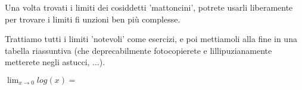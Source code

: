 Una volta trovati i limiti dei cosiddetti 'mattoncini', potrete usarli liberamente per trovare i limiti fi unzioni ben più complesse.

Trattiamo tutti i limiti 'notevoli' come esercizi, e poi mettiamoli alla fine in una tabella riassuntiva (che deprecabilmente
fotocopierete e lillipuzianamente metterete negli astucci, ...).

\begin{esercizio}
$\lim_{x \rightarrow 0} log(x)=$
\end{esercizio}



